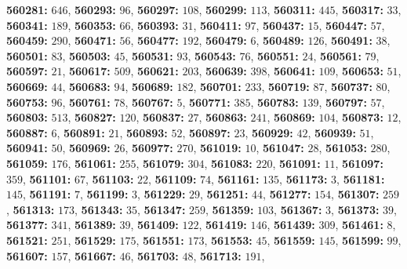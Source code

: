 \textsf{\bfseries 560281:} $646$, \textsf{\bfseries 560293:} $96$, \textsf{\bfseries 560297:} $108$, \textsf{\bfseries 560299:} $113$, \textsf{\bfseries 560311:} $445$, \textsf{\bfseries 560317:} $33$, \textsf{\bfseries 560341:} $189$, \textsf{\bfseries 560353:} $66$, \textsf{\bfseries 560393:} $31$, \textsf{\bfseries 560411:} $97$, \textsf{\bfseries 560437:} $15$, \textsf{\bfseries 560447:} $57$, \textsf{\bfseries 560459:} $290$, \textsf{\bfseries 560471:} $56$, \textsf{\bfseries 560477:} $192$, \textsf{\bfseries 560479:} $6$, \textsf{\bfseries 560489:} $126$, \textsf{\bfseries 560491:} $38$, \textsf{\bfseries 560501:} $83$, \textsf{\bfseries 560503:} $45$, \textsf{\bfseries 560531:} $93$, \textsf{\bfseries 560543:} $76$, \textsf{\bfseries 560551:} $24$, \textsf{\bfseries 560561:} $79$, \textsf{\bfseries 560597:} $21$, \textsf{\bfseries 560617:} $509$, \textsf{\bfseries 560621:} $203$, \textsf{\bfseries 560639:} $398$, \textsf{\bfseries 560641:} $109$, \textsf{\bfseries 560653:} $51$, \textsf{\bfseries 560669:} $44$, \textsf{\bfseries 560683:} $94$, \textsf{\bfseries 560689:} $182$, \textsf{\bfseries 560701:} $233$, \textsf{\bfseries 560719:} $87$, \textsf{\bfseries 560737:} $80$, \textsf{\bfseries 560753:} $96$, \textsf{\bfseries 560761:} $78$, \textsf{\bfseries 560767:} $5$, \textsf{\bfseries 560771:} $385$, \textsf{\bfseries 560783:} $139$, \textsf{\bfseries 560797:} $57$, \textsf{\bfseries 560803:} $513$, \textsf{\bfseries 560827:} $120$, \textsf{\bfseries 560837:} $27$, \textsf{\bfseries 560863:} $241$, \textsf{\bfseries 560869:} $104$, \textsf{\bfseries 560873:} $12$, \textsf{\bfseries 560887:} $6$, \textsf{\bfseries 560891:} $21$, \textsf{\bfseries 560893:} $52$, \textsf{\bfseries 560897:} $23$, \textsf{\bfseries 560929:} $42$, \textsf{\bfseries 560939:} $51$, \textsf{\bfseries 560941:} $50$, \textsf{\bfseries 560969:} $26$, \textsf{\bfseries 560977:} $270$, \textsf{\bfseries 561019:} $10$, \textsf{\bfseries 561047:} $28$, \textsf{\bfseries 561053:} $280$, \textsf{\bfseries 561059:} $176$, \textsf{\bfseries 561061:} $255$, \textsf{\bfseries 561079:} $304$, \textsf{\bfseries 561083:} $220$, \textsf{\bfseries 561091:} $11$, \textsf{\bfseries 561097:} $359$, \textsf{\bfseries 561101:} $67$, \textsf{\bfseries 561103:} $22$, \textsf{\bfseries 561109:} $74$, \textsf{\bfseries 561161:} $135$, \textsf{\bfseries 561173:} $3$, \textsf{\bfseries 561181:} $145$, \textsf{\bfseries 561191:} $7$, \textsf{\bfseries 561199:} $3$, \textsf{\bfseries 561229:} $29$, \textsf{\bfseries 561251:} $44$, \textsf{\bfseries 561277:} $154$, \textsf{\bfseries 561307:} $259$, \textsf{\bfseries 561313:} $173$, \textsf{\bfseries 561343:} $35$, \textsf{\bfseries 561347:} $259$, \textsf{\bfseries 561359:} $103$, \textsf{\bfseries 561367:} $3$, \textsf{\bfseries 561373:} $39$, \textsf{\bfseries 561377:} $341$, \textsf{\bfseries 561389:} $39$, \textsf{\bfseries 561409:} $122$, \textsf{\bfseries 561419:} $146$, \textsf{\bfseries 561439:} $309$, \textsf{\bfseries 561461:} $8$, \textsf{\bfseries 561521:} $251$, \textsf{\bfseries 561529:} $175$, \textsf{\bfseries 561551:} $173$, \textsf{\bfseries 561553:} $45$, \textsf{\bfseries 561559:} $145$, \textsf{\bfseries 561599:} $99$, \textsf{\bfseries 561607:} $157$, \textsf{\bfseries 561667:} $46$, \textsf{\bfseries 561703:} $48$, \textsf{\bfseries 561713:} $191$, 
